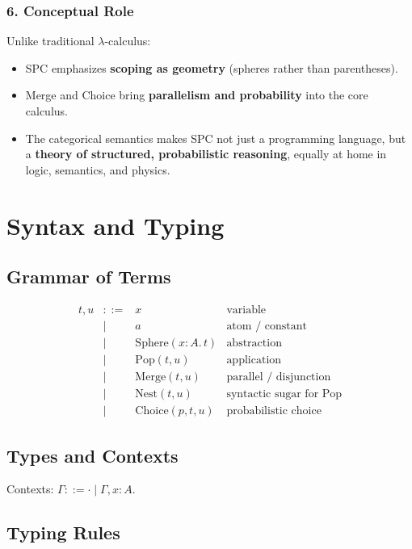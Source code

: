 \documentclass{article}
\begin{document}
\subsubsection{6. Conceptual Role}

Unlike traditional $\lambda$-calculus:

\begin{itemize}
\item SPC emphasizes \textbf{scoping as geometry} (spheres rather than parentheses).
\item Merge and Choice bring \textbf{parallelism and probability} into the core calculus.
\item The categorical semantics makes SPC not just a programming language, but a \textbf{theory of structured, probabilistic reasoning}, equally at home in logic, semantics, and physics.
\end{itemize}

\section{Syntax and Typing}\label{sec:syntax}

\subsection{Grammar of Terms}

\[
\begin{array}{rcll}
t,u & ::= & x & \text{variable} \\
     & \mid & a & \text{atom / constant} \\
     & \mid & \mathrm{Sphere}(x{:}A.\,t) & \text{abstraction} \\
     & \mid & \mathrm{Pop}(t,u) & \text{application} \\
     & \mid & \mathrm{Merge}(t,u) & \text{parallel / disjunction} \\
     & \mid & \mathrm{Nest}(t,u) & \text{syntactic sugar for Pop} \\
     & \mid & \mathrm{Choice}(p,t,u) & \text{probabilistic choice}
\end{array}
\]

\subsection{Types and Contexts}

Contexts: $\Gamma ::= \cdot \mid \Gamma, x{:}A$.

\subsection{Typing Rules}
\end{document}
